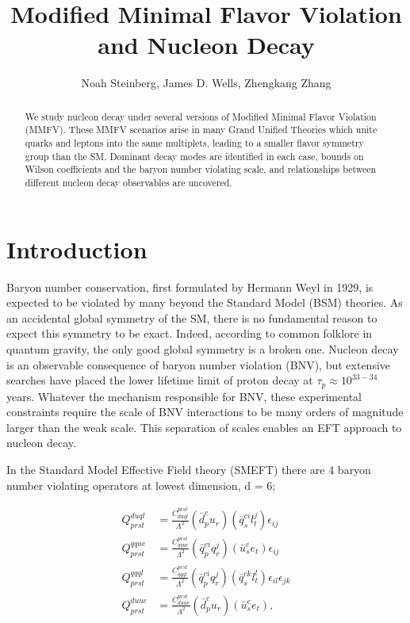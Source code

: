 \documentclass[aps,twocolumn,twoside,secnumarabic,balancelastpage,amsmath,amssymb,nofootinbib,hyperref=pdftex]{revtex4}
\begin{document}
\title{Modified Minimal Flavor Violation and Nucleon Decay}
\author         {Noah Steinberg, James D. Wells, Zhengkang Zhang}

\begin{abstract}
\small{We study nucleon decay under several versions of Modified Minimal Flavor Violation (MMFV). These MMFV scenarios arise in many Grand Unified Theories which unite quarks and leptons into the same multiplets, leading to a smaller flavor symmetry group than the SM. Dominant decay modes are identified in each case, bounds on Wilson coefficients and the baryon number violating scale, and relationships between different nucleon decay observables are uncovered.}
\end{abstract}

\maketitle

\section{Introduction}
Baryon number conservation, first formulated by Hermann Weyl in 1929\cite{Weyl}, is expected to be violated by many beyond the Standard Model (BSM) theories. As an accidental global symmetry of the SM, there is no fundamental reason to expect this symmetry to be exact. Indeed, according to common folklore in quantum gravity, the only good global symmetry is a broken one\cite{QG}. Nucleon decay is an observable consequence of baryon number violation (BNV), but extensive searches have placed the lower lifetime limit of proton decay at $\tau_{p}\approx 10^{33-34}$ years\cite{SuperK}. Whatever the mechanism responsible for BNV, these experimental constraints require the scale of BNV interactions to be many orders of magnitude larger than the weak scale. This separation of scales enables an EFT approach to nucleon decay.

In the Standard Model Effective Field theory (SMEFT) there are 4 baryon number violating operators\cite{Weinberg} at lowest dimension, d = 6;

\begin{equation}  \label{eq:1}
  \begin{aligned}
  Q^{duql}_{prst} &= \frac{C^{prst}_{duql}}{\Lambda^2}(\bar{d}^{c}_{p}u_{r})(\bar{q}^{ci}_{s}l^{j}_{t})\epsilon_{ij} \\
  Q^{qque}_{prst} &=  \frac{C^{prst}_{qque}}{\Lambda^2}(\bar{q}^{ci}_{p}q^{j}_{r})(\bar{u}^{c}_{s}e_{t})\epsilon_{ij} \\
  Q^{qqql}_{prst} &=  \frac{C^{prst}_{qqql}}{\Lambda^2}(\bar{q}^{ci}_{p}q^{j}_{r})(\bar{q}^{ck}_{s}l^{l}_{t})\epsilon_{il}\epsilon_{jk} \\
  Q^{duue}_{prst} &=  \frac{C^{prst}_{duue}}{\Lambda^2}(\bar{d}^{c}_{p}u_{r})(\bar{u}^{c}_{s}e_{t}),
  \end{aligned}
\end{equation}
\end{document}

